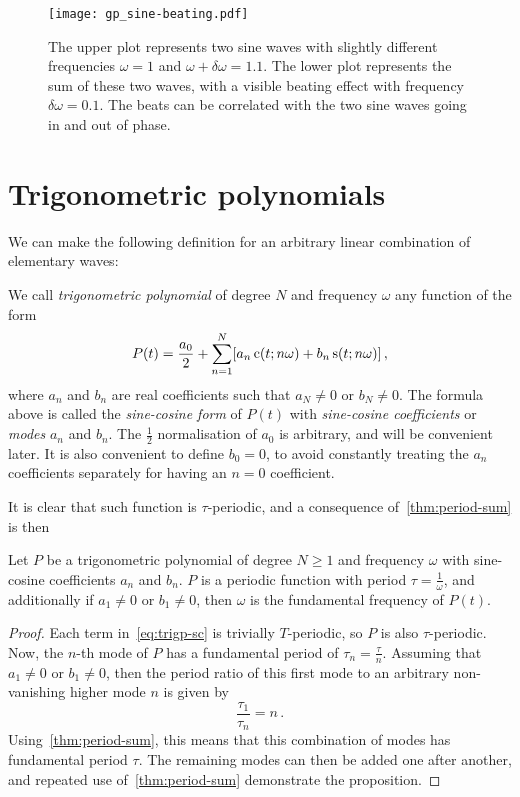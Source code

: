 \begin{figure}
  \centering
  \texttt{[image: gp\_sine-beating.pdf]}
  \caption{The upper plot represents two sine waves with slightly different frequencies
    $\omega=1$ and $\omega+\delta\omega=1.1$. The lower plot represents the sum of these
    two waves, with a visible beating effect with frequency $\delta\omega=0.1$. The beats
  can be correlated with the two sine waves going in and out of phase.}
  \label{fig:beating}
\end{figure}
\section{Trigonometric polynomials}
We can make the following definition for an arbitrary linear combination of elementary
waves:
\begin{definition}
  We call \emph{trigonometric polynomial} of degree $N$ and frequency $\omega$ any
  function of the form
  \begin{equation}
    P(t)=\frac{a_0}{2}+\sum_{n=1}^N[a_n\operatorname{c}(t;n\omega)+b_n\operatorname{s}(t;n\omega)]\,,
    \label{eq:trigp-sc}
  \end{equation}
  where $a_n$ and $b_n$ are real coefficients such that $a_N\neq 0$ or $b_N \neq 0$. The
  formula above is called the \emph{sine-cosine form} of $P(t)$ with \emph{sine-cosine
  coefficients} or \emph{modes} $a_n$ and $b_n$. The $\frac{1}{2}$ normalisation of $a_0$
  is arbitrary, and will be convenient later. It is also convenient to define $b_0=0$, to
  avoid constantly treating the $a_n$ coefficients separately for having an $n=0$
  coefficient.
\end{definition}
It is clear that such function is $\tau$-periodic, and a consequence
of~\cref{thm:period-sum} is then
\begin{proposition}
  Let $P$ be a trigonometric polynomial of degree $N\geq 1$ and frequency $\omega$ with
  sine-cosine coefficients $a_n$ and $b_n$. $P$ is a periodic function with period
  $\tau=\frac{1}{\omega}$, and additionally if $a_1\neq0$ or $b_1\neq0$, then $\omega$ is
  the fundamental frequency of $P(t)$.
\end{proposition}
\begin{proof}
  Each term in~\cref{eq:trigp-sc} is trivially $T$-periodic, so $P$ is also
  $\tau$-periodic. Now, the $n$-th mode of $P$ has a fundamental period of
  $\tau_n=\frac{\tau}{n}$. Assuming that $a_1\neq0$ or $b_1\neq0$, then the period ratio
  of this first mode to an arbitrary non-vanishing higher mode $n$ is given by
  \begin{equation}
    \frac{\tau_1}{\tau_n}=n\,.
  \end{equation}
  Using~\cref{thm:period-sum}, this means that this combination of modes has fundamental
  period $\tau$. The remaining modes can then be added one after another, and repeated use
  of~\cref{thm:period-sum} demonstrate the proposition.
\end{proof}
